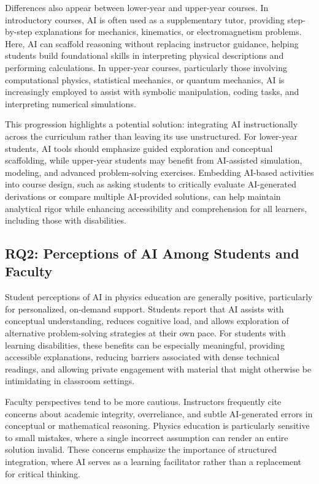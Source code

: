 \documentclass[]{aastex701}
\begin{document}
Differences also appear between lower-year and upper-year courses. In introductory courses, AI is often used as a supplementary tutor, providing step-by-step explanations for mechanics, kinematics, or electromagnetism problems. Here, AI can scaffold reasoning without replacing instructor guidance, helping students build foundational skills in interpreting physical descriptions and performing calculations. In upper-year courses, particularly those involving computational physics, statistical mechanics, or quantum mechanics, AI is increasingly employed to assist with symbolic manipulation, coding tasks, and interpreting numerical simulations.

This progression highlights a potential solution: integrating AI instructionally across the curriculum rather than leaving its use unstructured. For lower-year students, AI tools should emphasize guided exploration and conceptual scaffolding, while upper-year students may benefit from AI-assisted simulation, modeling, and advanced problem-solving exercises. Embedding AI-based activities into course design, such as asking students to critically evaluate AI-generated derivations or compare multiple AI-provided solutions, can help maintain analytical rigor while enhancing accessibility and comprehension for all learners, including those with disabilities.

\subsection{RQ2: Perceptions of AI Among Students and Faculty}

Student perceptions of AI in physics education are generally positive, particularly for personalized, on-demand support. Students report that AI assists with conceptual understanding, reduces cognitive load, and allows exploration of alternative problem-solving strategies at their own pace. For students with learning disabilities, these benefits can be especially meaningful, providing accessible explanations, reducing barriers associated with dense technical readings, and allowing private engagement with material that might otherwise be intimidating in classroom settings.

Faculty perspectives tend to be more cautious. Instructors frequently cite concerns about academic integrity, overreliance, and subtle AI-generated errors in conceptual or mathematical reasoning. Physics education is particularly sensitive to small mistakes, where a single incorrect assumption can render an entire solution invalid. These concerns emphasize the importance of structured integration, where AI serves as a learning facilitator rather than a replacement for critical thinking.
\end{document}

